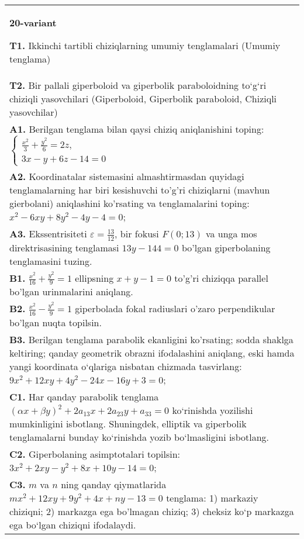 \documentclass{article}
\begin{document}
\begin{tabular}{m{17cm}}
\textbf{20-variant}
\newline

\textbf{T1.} Ikkinchi tartibli chiziqlarning umumiy tenglamalari (Umumiy tenglama) \\
\textbf{T2.} Bir pallali giperboloid va giperbolik paraboloidning to‘g‘ri chiziqli yasovchilari (Giperboloid, Giperbolik paraboloid, Chiziqli yasovchilar) \\
\textbf{A1.} Berilgan tenglama bilan qaysi chiziq aniqlanishini toping: $\left\{\begin{array}{l}\frac{x^2}{3}+\frac{y^2}{6}=2 z, \\ 3 x-y+6 z-14=0\end{array}\right.$ \\
\textbf{A2.} Koordinatalar sistemasini almashtirmasdan quyidagi tenglamalarning har biri kesishuvchi to'g'ri chiziqlarni (mavhun gierbolani) aniqlashini ko'rsating va tenglamalarini toping: $x^2-6 x y+8 y^2-4 y-4=0$; \\
\textbf{A3.} Ekssentrisiteti $\varepsilon=\frac{13}{12}$, bir fokusi $F(0 ; 13)$ va unga mos direktrisasining tenglamasi $13 y-144=0$ bo'lgan giperbolaning tenglamasini tuzing. \\
\textbf{B1.} $\frac{x^2}{16}+\frac{y^2}{9}=1$ ellipsning $x+y-1=0$ to'g'ri chiziqqa parallel bo'lgan urinmalarini aniqlang. \\
\textbf{B2.} $\frac{x^2}{16}-\frac{y^2}{9}=1$ giperbolada fokal radiuslari o'zaro perpendikular bo'lgan nuqta topilsin. \\
\textbf{B3.} Berilgan tenglama parabolik ekanligini ko'rsating; sodda shaklga keltiring; qanday geometrik obrazni ifodalashini aniqlang, eski hamda yangi koordinata o‘qlariga nisbatan chizmada tasvirlang: $9 x^2+12 x y+4 y^2-24 x-16 y+3=0$; \\
\textbf{C1.} Har qanday parabolik tenglama $ (\alpha x+\beta y) ^2+2a_{13}x+2a_{23}y+a_{33}=0$ ko‘rinishda yozilishi mumkinligini isbotlang. Shuningdek, elliptik va giperbolik tenglamalarni bunday ko‘rinishda yozib bo‘lmasligini isbotlang. \\
\textbf{C2.} Giperbolaning asimptotalari topilsin: $3 x^2+2 x y-y^2+8 x+10 y-14=0$; \\
\textbf{C3.} $m$ va $n$ ning qanday qiymatlarida $m x^2+12 x y+9 y^2+4 x+n y-13=0$ tenglama: 1) markaziy chiziqni; 2) markazga ega bo'lmagan chiziq; 3) cheksiz ko‘p markazga ega bo‘lgan chiziqni ifodalaydi. \\

\end{tabular}
\vspace{1cm}
\end{document}

